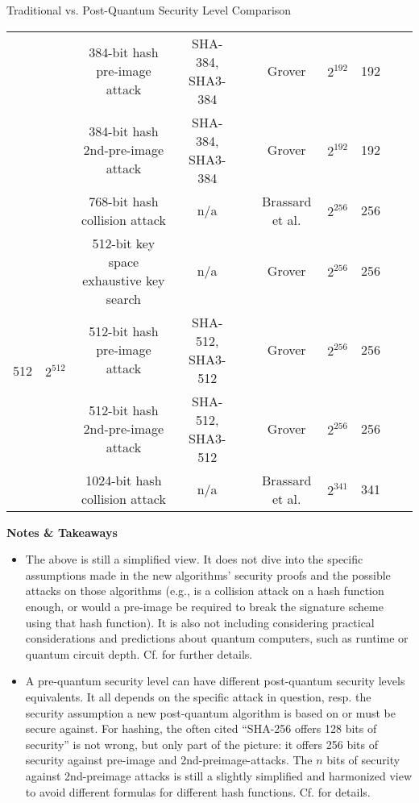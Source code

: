 \begin{algorithmbox}{Traditional vs. Post-Quantum Security Level Comparison}
\begin{center}
\begin{tabular}{cc|ccc|ccccc}
            &  & 384-bit hash pre-image attack & SHA-384, SHA3-384 &  & Grover & $2^{192}$ & 192 &  & \\
            &  & 384-bit hash 2nd-pre-image attack & SHA-384, SHA3-384 &  & Grover & $2^{192}$ & 192 & & \\
            &  & 768-bit hash collision attack & n/a &  & Brassard et al. & $2^{256}$ & 256 &  & \\
            \hline
            \multirow{4}{*}{512} & \multirow{4}{*}{$2^{512}$} & 512-bit key space exhaustive key search & n/a &  & Grover & $2^{256}$ & 256 &  & \\
            &  & 512-bit hash pre-image attack & SHA-512, SHA3-512 &  & Grover & $2^{256}$ & 256 &  & \\
            &  & 512-bit hash 2nd-pre-image attack & SHA-512, SHA3-512 &  & Grover & $2^{256}$ & 256 & & \\
            &  & 1024-bit hash collision attack & n/a &  & Brassard et al. & $2^{341}$ & 341 &  & \\
            \hline
        \end{tabular}
    \end{center}
    {\bfseries Notes \& Takeaways}
    \normalfont
    \begin{itemize}
        \item The above is still a simplified view. It does not dive into the specific assumptions made in the new algorithms' security proofs and the possible attacks on those algorithms (e.g., is a collision attack on a hash function enough, or would a pre-image be required to break the signature scheme using that hash function). It is also not including considering practical considerations and predictions about quantum computers, such as runtime or quantum circuit depth. Cf.  for further details.
        \item A pre-quantum security level can have different post-quantum security levels equivalents. It all depends on the specific attack in question, resp. the security assumption a new post-quantum algorithm is based on or must be secure against. For hashing, the often cited ``SHA-256 offers 128 bits of security'' is not wrong, but only part of the picture: it offers 256 bits of security against pre-image and 2nd-preimage-attacks. The $n$ bits of security against 2nd-preimage attacks is still a slightly simplified and harmonized view to avoid different formulas for different hash functions. Cf.  for details.

\end{itemize}
\end{algorithmbox}
